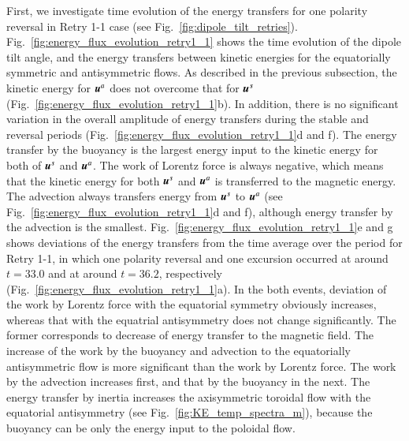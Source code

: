 First, we investigate time evolution of the energy transfers for one polarity reversal in Retry 1-1 case (see Fig.~\ref{fig:dipole_tilt_retries}). 
Fig.~\ref{fig:energy_flux_evolution_retry1_1} shows the time evolution of the dipole tilt angle, and the energy transfers between kinetic energies for the equatorially symmetric and antisymmetric flows.
As described in the previous subsection, the kinetic energy for $\mbox{\boldmath$u$}^a$ does not overcome that for $\mbox{\boldmath$u$}^s$ (Fig.~\ref{fig:energy_flux_evolution_retry1_1}b).
In addition, there is no significant variation in the overall amplitude of energy transfers during the stable and reversal periods (Fig.~\ref{fig:energy_flux_evolution_retry1_1}d and f).
The energy transfer by the buoyancy is the largest energy input to the kinetic energy for both of $\mbox{\boldmath$u$}^s$ and $\mbox{\boldmath$u$}^a$.
The work of Lorentz force is always negative, which means that the kinetic energy for both $\mbox{\boldmath$u$}^s$ and $\mbox{\boldmath$u$}^a$ is transferred to the magnetic energy.
The advection always transfers energy from $\mbox{\boldmath$u$}^s$ to $\mbox{\boldmath$u$}^a$ (see Fig.~\ref{fig:energy_flux_evolution_retry1_1}d and f), although energy transfer by the advection is the smallest.
Fig.~\ref{fig:energy_flux_evolution_retry1_1}e and g shows deviations of the energy transfers from the time average over the period for Retry 1-1, in which one polarity reversal and one excursion occurred at around $t = 33.0$ and at around $t = 36.2$, respectively (Fig.~\ref{fig:energy_flux_evolution_retry1_1}a).
In the both events, deviation of the work by Lorentz force with the equatorial symmetry obviously increases, whereas that with the equatrial antisymmetry does not change significantly.
The former corresponds to decrease of energy transfer to the magnetic field.
The increase of the work by the buoyancy and advection to the equatorially antisymmetric flow is more significant than the work by Lorentz force.
The work by the advection increases first, and that by the buoyancy in the next. 
The energy transfer by inertia increases the axisymmetric toroidal flow with the equatorial antisymmetry (see Fig.~\ref{fig:KE_temp_spectra_m}), because the buoyancy can be only the energy input to the poloidal flow.





